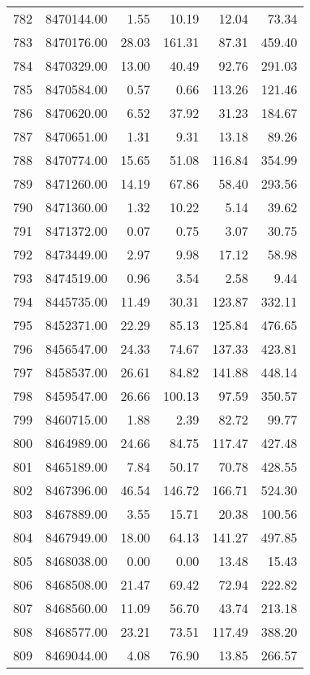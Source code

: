 \begin{table}[ht]
\begin{tabular}{rrrrrr}
  782 & 8470144.00 & 1.55 & 10.19 & 12.04 & 73.34 \\ 
  783 & 8470176.00 & 28.03 & 161.31 & 87.31 & 459.40 \\ 
  784 & 8470329.00 & 13.00 & 40.49 & 92.76 & 291.03 \\ 
  785 & 8470584.00 & 0.57 & 0.66 & 113.26 & 121.46 \\ 
  786 & 8470620.00 & 6.52 & 37.92 & 31.23 & 184.67 \\ 
  787 & 8470651.00 & 1.31 & 9.31 & 13.18 & 89.26 \\ 
  788 & 8470774.00 & 15.65 & 51.08 & 116.84 & 354.99 \\ 
  789 & 8471260.00 & 14.19 & 67.86 & 58.40 & 293.56 \\ 
  790 & 8471360.00 & 1.32 & 10.22 & 5.14 & 39.62 \\ 
  791 & 8471372.00 & 0.07 & 0.75 & 3.07 & 30.75 \\ 
  792 & 8473449.00 & 2.97 & 9.98 & 17.12 & 58.98 \\ 
  793 & 8474519.00 & 0.96 & 3.54 & 2.58 & 9.44 \\ 
  794 & 8445735.00 & 11.49 & 30.31 & 123.87 & 332.11 \\ 
  795 & 8452371.00 & 22.29 & 85.13 & 125.84 & 476.65 \\ 
  796 & 8456547.00 & 24.33 & 74.67 & 137.33 & 423.81 \\ 
  797 & 8458537.00 & 26.61 & 84.82 & 141.88 & 448.14 \\ 
  798 & 8459547.00 & 26.66 & 100.13 & 97.59 & 350.57 \\ 
  799 & 8460715.00 & 1.88 & 2.39 & 82.72 & 99.77 \\ 
  800 & 8464989.00 & 24.66 & 84.75 & 117.47 & 427.48 \\ 
  801 & 8465189.00 & 7.84 & 50.17 & 70.78 & 428.55 \\ 
  802 & 8467396.00 & 46.54 & 146.72 & 166.71 & 524.30 \\ 
  803 & 8467889.00 & 3.55 & 15.71 & 20.38 & 100.56 \\ 
  804 & 8467949.00 & 18.00 & 64.13 & 141.27 & 497.85 \\ 
  805 & 8468038.00 & 0.00 & 0.00 & 13.48 & 15.43 \\ 
  806 & 8468508.00 & 21.47 & 69.42 & 72.94 & 222.82 \\ 
  807 & 8468560.00 & 11.09 & 56.70 & 43.74 & 213.18 \\ 
  808 & 8468577.00 & 23.21 & 73.51 & 117.49 & 388.20 \\ 
  809 & 8469044.00 & 4.08 & 76.90 & 13.85 & 266.57 \\ 

\end{tabular}
\end{table}
